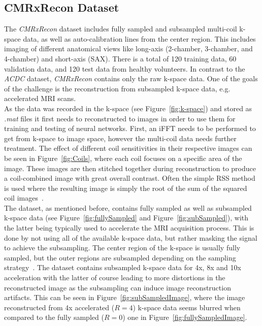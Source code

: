 \subsection{CMRxRecon Dataset} \label{SubSec:CMRxRecon}
The \emph{CMRxRecon} dataset includes 
fully sampled and subsampled multi-coil k-space data, as well as auto-calibration lines from the center region. This includes imaging of different anatomical views like long-axis (2-chamber, 3-chamber, and 4-chamber) and short-axis (SAX). There is a total of 120 training data, 60 validation data, and 120 test data from healthy volunteers. In contrast to the \emph{ACDC} dataset, \emph{CMRxRecon} contains only the raw k-space data. One of the goals of the challenge is the reconstruction from subsampled k-space data, e.g. accelerated MRI scans.\\
As the data was recorded in the k-space (see Figure~\ref{fig:k-space}) and stored as \emph{.mat} files it first needs to reconstructed to images in order to use them for training and testing of neural networks. First, an iFFT needs to be performed to get from k-space to image space, however the multi-coil data needs further treatment. The effect of different coil sensitivities in their respective images can be seen in Figure~\ref{fig:Coils}, where each coil focuses on a specific area of the image. These images are then stitched together during reconstruction to produce a coil-combined image with great overall contrast. Often the simple RSS method is used where the resulting image is simply the root of the sum of the squared coil images~\cite{Roemer1990}. \\
The dataset, as mentioned before, contains fully sampled as well as subsampled k-space data (see Figure~\ref{fig:fullySampled} and Figure~\ref{fig:subSampled}), with the latter being typically used to accelerate the MRI acquisition process. This is done by not using all of the available k-space data, but rather masking the signal to achieve the subsampling. The center region of the k-space is usually fully sampled, but the outer regions are subsampled depending on the sampling strategy~\cite{SamplingStrategies}. The dataset contains subsampled k-space data for 4x, 8x and 10x acceleration with the latter of course leading to more distortions in the reconstructed image as the subsampling can induce image reconstruction artifacts. This can be seen in Figure~\ref{fig:subSampledImage}, where the image reconstructed from 4x accelerated ($R=4$) k-space data seems blurred when compared to the fully sampled ($R=0$) one in Figure~\ref{fig:fullySampledImage}. \\
